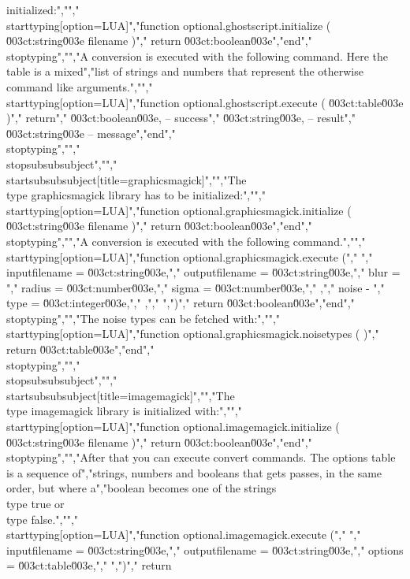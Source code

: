 initialized:","","\\starttyping[option=LUA]","function optional.ghostscript.initialize ( \u003ct:string\u003e filename )","    return \u003ct:boolean\u003e","end","\\stoptyping","","A conversion is executed with the following command. Here the table is a mixed","list of strings and numbers that represent the otherwise command like arguments.","","\\starttyping[option=LUA]","function optional.ghostscript.execute ( \u003ct:table\u003e )","    return","        \u003ct:boolean\u003e, -- success","        \u003ct:string\u003e,  -- result","        \u003ct:string\u003e   -- message","end","\\stoptyping","","\\stopsubsubsubject","","\\startsubsubsubject[title=graphicsmagick]","","The \\type {graphicsmagick} library has to be initialized:","","\\starttyping[option=LUA]","function optional.graphicsmagick.initialize ( \u003ct:string\u003e filename )","    return \u003ct:boolean\u003e","end","\\stoptyping","","A conversion is executed with the following command.","","\\starttyping[option=LUA]","function optional.graphicsmagick.execute (","    {","        inputfilename  = \u003ct:string\u003e,","        outputfilename = \u003ct:string\u003e,","        blur           = {","            radius = \u003ct:number\u003e,","            sigma  = \u003ct:number\u003e,","        },","        noise          - {","            type   = \u003ct:integer\u003e,","        },","    }",")","    return \u003ct:boolean\u003e","end","\\stoptyping","","The noise types can be fetched with:","","\\starttyping[option=LUA]","function optional.graphicsmagick.noisetypes ( )","    return \u003ct:table\u003e","end","\\stoptyping","","\\stopsubsubsubject","","\\startsubsubsubject[title=imagemagick]","","The \\type {imagemagick} library is initialized with:","","\\starttyping[option=LUA]","function optional.imagemagick.initialize ( \u003ct:string\u003e filename )","    return \u003ct:boolean\u003e","end","\\stoptyping","","After that you can execute convert commands. The options table is a sequence of","strings, numbers and booleans that gets passes, in the same order, but where a","boolean becomes one of the strings \\type {true} or \\type {false}.","","\\starttyping[option=LUA]","function optional.imagemagick.execute (","    {","        inputfilename  = \u003ct:string\u003e,","        outputfilename = \u003ct:string\u003e,","        options        = \u003ct:table\u003e,","    }",")","    return 